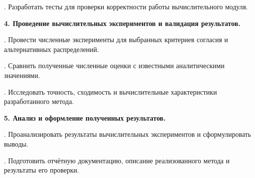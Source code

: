 \documentclass[12pt,a4paper]{article}
\begin{document}
. Разработать тесты для проверки корректности работы вычислительного модуля.

\medskip
\noindent\textbf{4. Проведение вычислительных экспериментов и валидация результатов.}

. Провести численные эксперименты для выбранных критериев согласия и альтернативных распределений.

. Сравнить полученные численные оценки с известными аналитическими значениями.

. Исследовать точность, сходимость и вычислительные характеристики разработанного метода.

\medskip
\noindent\textbf{5. Анализ и оформление полученных результатов.}

. Проанализировать результаты вычислительных экспериментов и сформулировать выводы.

. Подготовить отчётную документацию, описание реализованного метода и результаты его проверки.
\end{document}
